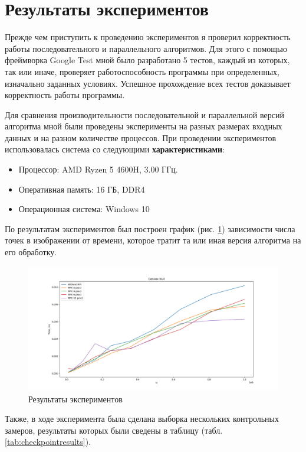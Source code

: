 \documentclass[a4paper, 12pt]{extarticle}
\newcommand{\n}{\par}
\begin{document}
	\section{Результаты экспериментов}
	Прежде чем приступить к проведению экспериментов я проверил корректность работы последовательного и параллельного алгоритмов. Для этого с помощью фреймворка Google Test мной было разработано 5 тестов, каждый из которых, так или иначе, проверяет работоспособность программы при определенных, изначально заданных условиях. Успешное прохождение всех тестов доказывает корректность работы программы.\n
	Для сравнения производительности последовательной и параллельной версий алгоритма мной были проведены эксперименты на разных размерах входных данных и на разном количестве процессов. При проведении экспериментов использовалась система со следующими \textbf{характеристиками}:
	\begin{itemize}
		\item Процессор: AMD Ryzen 5 4600H, 3.00 ГГц.
		\item Оперативная память: 16 ГБ, DDR4
		\item Операционная система: Windows 10
	\end{itemize}
	По результатам экспериментов был построен график (рис. \ref{fig:results}) зависимости числа точек в изображении от времени, которое тратит та или иная версия алгоритма на его обработку.
	\begin{figure}[h]
		\centering
		\includegraphics[width=\linewidth]{img/test.png}
		\caption{Результаты экспериментов}
		\label{fig:results}
	\end{figure}
	Также, в ходе эксперимента была сделана выборка нескольких контрольных замеров, результаты которых были сведены в таблицу (табл. \ref{tab:checkpointresults}).
	
\end{document}
